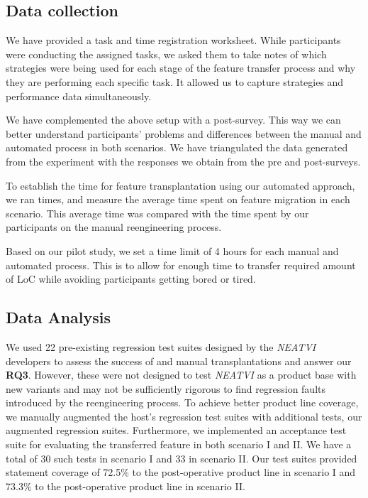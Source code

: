 \subsection{Data collection}

We have provided a task and time registration worksheet. While participants were conducting the assigned tasks, we asked them to take notes of which strategies were being used for each stage of the feature transfer process and why they are performing each specific task. It allowed us to capture strategies and performance data simultaneously. 

We have complemented the above setup with a post-survey. This way we can better understand participants' problems and differences between the manual and automated process in both scenarios. We have triangulated the data generated from the experiment with the responses we obtain from the pre and post-surveys.

To establish the time for feature transplantation using our automated approach, we ran  times, and measure the average time spent on feature migration in each scenario. This average time was compared with the time spent by our participants on the manual reengineering process.

Based on our pilot study, we set a time limit of 4 hours for each manual and automated process. 
This is to allow for enough time to transfer required amount of LoC while avoiding participants getting bored or tired.

\subsection{Data Analysis}
\label{sec:experiment_data_analysis}
We used 22 pre-existing regression test suites designed by the \emph{NEATVI} developers to assess the success of \prodscalpel and manual transplantations and answer our \textbf{RQ3}. 
However, these were not designed to test \emph{NEATVI} as a product base with new variants and may not be sufficiently rigorous to find regression faults introduced by the reengineering process. 
To achieve better product line coverage, we manually augmented the host’s regression test suites with additional tests, our augmented regression suites.
Furthermore, we implemented an acceptance test suite for evaluating the transferred feature in both scenario I and II.
We have a total of 30 such tests in scenario I and 33 in scenario II. 
Our test suites provided statement coverage of 72.5\% to the post-operative product line in scenario I and 73.3\% to the post-operative product line in scenario II.

